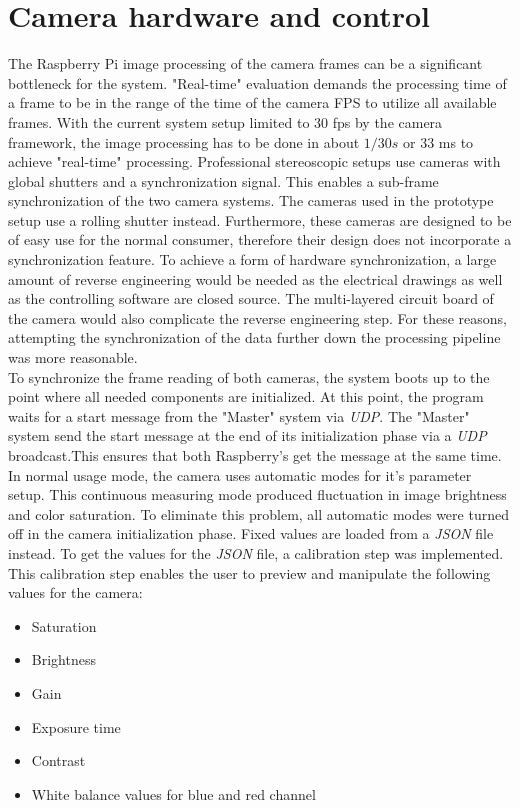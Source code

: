 \section{Camera hardware and control}
The Raspberry Pi image processing of the camera frames can be a significant bottleneck for the system. "Real-time" evaluation demands the processing time of a frame to be in the range of the time of the camera FPS to utilize all available frames. With the current system setup limited to 30 fps by the camera framework, the image processing has to be done in about $1/30s$ or 33 ms to achieve "real-time" processing. Professional stereoscopic setups use cameras with global shutters and a synchronization signal. This enables a sub-frame synchronization of the two camera systems. The cameras used in the prototype setup use a rolling shutter instead. Furthermore, these cameras are designed to be of easy use for the normal consumer, therefore their design does not incorporate a synchronization feature. To achieve a form of hardware synchronization, a large amount of reverse engineering would be needed as the electrical drawings as well as the controlling software are closed source. The multi-layered circuit board of the camera would also complicate the reverse engineering step.  For these reasons, attempting the synchronization of the data further down the processing pipeline was more reasonable.
\\To synchronize the  frame reading of both cameras, the system boots up to the point where all needed components are initialized. At this point, the program waits for a start message from the "Master" system via \textit{UDP}. The "Master" system send the start message at the end of its initialization phase via a \textit{UDP} broadcast.This ensures that both Raspberry's get the message at the same time.
In normal usage mode, the camera uses automatic modes for it's parameter setup. This continuous measuring mode produced fluctuation in image brightness and color saturation. To eliminate this problem, all automatic modes were turned off in the camera initialization phase. Fixed values are loaded from a \textit{JSON} file instead. To get the values for the \textit{JSON} file, a calibration step was implemented. This calibration step enables the user to preview and manipulate the following values for the camera:
\begin{itemize}
\item Saturation
\item Brightness
\item Gain
\item Exposure time
\item Contrast
\item White balance values for blue and red channel
\end{itemize}
